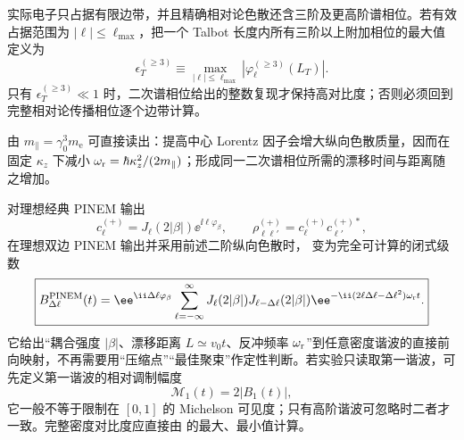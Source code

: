 实际电子只占据有限边带，并且精确相对论色散还含三阶及更高阶谱相位。若有效占据范围为 $|\ell|\le\ell_{\max}$，把一个 Talbot 长度内所有三阶以上附加相位的最大值定义为
\begin{equation}
 \boxed{
 \epsilon_T^{(\ge3)}
 \equiv
 \max_{|\ell|\le\ell_{\max}}
 \left|\varphi_\ell^{(\ge3)}(L_T)\right|.}
 \label{eq:electron-talbot-higher-order-control-dp76}
\end{equation}
只有 $\epsilon_T^{(\ge3)}\ll1$ 时，二次谱相位给出的整数复现才保持高对比度；否则必须回到完整相对论传播相位逐个边带计算。

由 $m_\parallel=\gamma_0^3m_{\mathrm e}$ 可直接读出：提高中心 Lorentz 因子会增大纵向色散质量，因而在固定 $\kappa_z$ 下减小 $\omega_{\rm r}=\hbar\kappa_z^2/(2m_\parallel)$；形成同一二次谱相位所需的漂移时间与距离随之增加。

对理想经典 PINEM 输出
\begin{equation*}
 c_\ell^{(+)}
 =J_\ell(2|\beta|)
 \ee^{\ii\ell\varphi_\beta},
 \qquad
 \rho_{\ell\ell'}^{(+)}=c_\ell^{(+)}c_{\ell'}^{(+)*},
\end{equation*}
在理想双边 PINEM 输出并采用前述二阶纵向色散时， 变为完全可计算的闭式级数
\begin{equation}
\boxed{
 B_{\Delta\ell}^{\rm PINEM}(t)
 =\ee^{\ii \Delta\ell\varphi_\beta}
 \sum_{\ell=-\infty}^{\infty}
 J_\ell(2|\beta|)J_{\ell-\Delta\ell}(2|\beta|)
 \ee^{-\ii(2\ell \Delta\ell-\Delta\ell^2)\omega_{\rm r}t}.}
\label{eq:pinem_bunching_exact_series_dp46}
\end{equation}
它给出“耦合强度 $|\beta|$、漂移距离 $L\simeq v_0t$、反冲频率 $\omega_{\rm r}$”到任意密度谐波的直接前向映射，不再需要用“压缩点”“最佳聚束”作定性判断。若实验只读取第一谐波，可先定义第一谐波的相对调制幅度
\begin{equation}
\boxed{\mathcal M_1(t)=2|B_1(t)|,}
\label{eq:first_harmonic_visibility_dp46}
\end{equation}
它一般不等于限制在 $[0,1]$ 的 Michelson 可见度；只有高阶谐波可忽略时二者才一致。完整密度对比度应直接由 的最大、最小值计算。

